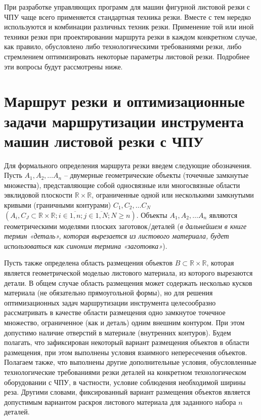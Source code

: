 \documentclass[12pt]{report}
\begin{document}
При разработке управляющих программ для
машин фигурной листовой резки с ЧПУ чаще всего
применяется стандартная техника резки.
Вместе с тем нередко используются и
комбинации различных техник резки.
Применение той или иной техники резки
при проектировании маршрута резки в
каждом конкретном случае, как правило,
обусловлено либо технологическими требованиями резки,
либо стремлением оптимизировать некоторые
параметры листовой резки.
Подробнее эти вопросы будут рассмотрены ниже.

\section{Маршрут резки и оптимизационные задачи маршрутизации инструмента машин листовой резки с ЧПУ}

Для формального определения маршрута резки
введем следующие обозначения.
Пусть
$A_1, A_2, \dots A_n$
– двумерные геометрические объекты (точечные замкнутые множества),
представляющие собой односвязные или
многосвязные области эвклидовой плоскости
$\mathbb R \times \mathbb R$,
ограниченные одной или несколькими замкнутыми кривыми
(граничными контурами)
$C_1, C_2, \dots C_N$
$(A_i, C_J \subset \mathbb R \times \mathbb R;
i \in \overline{1,n};
j \in \overline{1, N};
N \geqslant n)$.
Объекты
$A_1, A_2, \dots A_n$
являются геометрическими моделями плоских заготовок/деталей
({\it в дальнейшем в книге термин «деталь»,
которая вырезается из листового материала,
будет использоваться как синоним термина «заготовка»}).

Пусть также определена область размещения объектов
$B \subset \mathbb R \times \mathbb R$,
которая является геометрической моделью листового материала,
из которого вырезаются детали.
В общем случае область размещения
может содержать несколько кусков материала
(не обязательно прямоугольной формы),
но для решения оптимизационных задач
маршрутизации инструмента целесообразно рассматривать
в качестве области размещения одно замкнутое точечное множество,
ограниченное (как и деталь)
одним внешним контуром.
При этом допустимо наличие отверстий в материале
(внутренних контуров).
Будем полагать, что зафиксирован некоторый вариант размещения
объектов в области размещения,
при этом выполнены условия взаимного непересечения объектов.
Полагаем также, что выполнены другие дополнительные условия,
обусловленные технологические требованиями резки деталей
на конкретном технологическом оборудовании с ЧПУ,
в частности, условие соблюдения необходимой ширины реза.
Другими словами, фиксированный вариант размещения объектов
является допустимым вариантом раскроя листового материала
для заданного набора $n$ деталей.
\end{document}
